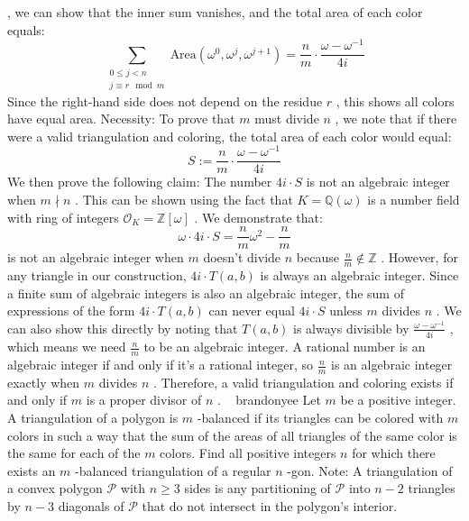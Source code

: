 \documentclass[12pt]{article}
\begin{document}
, we can show that the inner sum vanishes, and the total area of each color equals: \[\sum_{\substack{0 \leq j < n \\ j \equiv r \mod m}} \text{Area}(\omega^0, \omega^j, \omega^{j+1}) = \frac{n}{m} \cdot \frac{\omega - \omega^{-1}}{4i}\] Since the right-hand side does not depend on the residue $r$ , this shows all colors have equal area. Necessity: To prove that $m$ must divide $n$ , we note that if there were a valid triangulation and coloring, the total area of each color would equal: \[S := \frac{n}{m} \cdot \frac{\omega - \omega^{-1}}{4i}\] We then prove the following claim: The number $4i \cdot S$ is not an algebraic integer when $m \nmid n$ . This can be shown using the fact that $K = \mathbb{Q}(\omega)$ is a number field with ring of integers $\mathcal{O}_K = \mathbb{Z}[\omega]$ . We demonstrate that: \[\omega \cdot 4i \cdot S = \frac{n}{m}\omega^2 - \frac{n}{m}\] is not an algebraic integer when $m$ doesn't divide $n$ because $\frac{n}{m} \not\in \mathbb{Z}$ . However, for any triangle in our construction, $4i \cdot T(a,b)$ is always an algebraic integer. Since a finite sum of algebraic integers is also an algebraic integer, the sum of expressions of the form $4i \cdot T(a,b)$ can never equal $4i \cdot S$ unless $m$ divides $n$ . We can also show this directly by noting that $T(a,b)$ is always divisible by $\frac{\omega - \omega^{-1}}{4i}$ , which means we need $\frac{n}{m}$ to be an algebraic integer. A rational number is an algebraic integer if and only if it's a rational integer, so $\frac{n}{m}$ is an algebraic integer exactly when $m$ divides $n$ . Therefore, a valid triangulation and coloring exists if and only if $m$ is a proper divisor of $n$ . ~ brandonyee Let $m$ be a positive integer. A triangulation of a polygon is $m$ -balanced if its triangles can be colored with $m$ colors in such a way that the sum of the areas of all triangles of the same color is the same for each of the $m$ colors. Find all positive integers $n$ for which there exists an $m$ -balanced triangulation of a regular $n$ -gon.
Note: A triangulation of a convex polygon $\mathcal{P}$ with $n \geq 3$ sides is any partitioning of $\mathcal{P}$ into $n-2$ triangles by $n-3$ diagonals of $\mathcal{P}$ that do not intersect in the polygon's interior.
\end{document}
